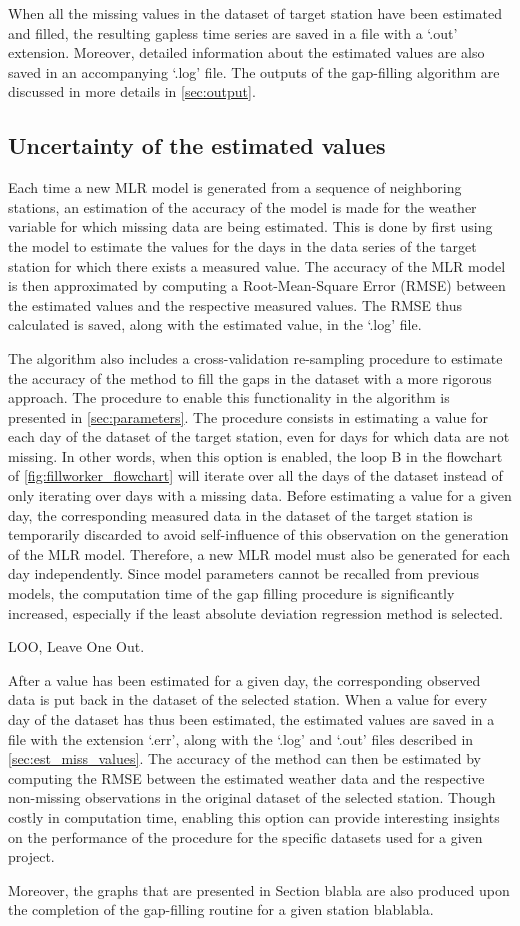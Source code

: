 \documentclass[TechnicalNoteMeteo.tex]{subfiles}
\begin{document}
When all the missing values in the dataset of target station have been estimated and filled, the resulting gapless time series are saved in a file with a `.out' extension. Moreover, detailed information about the estimated values are also saved in an accompanying `.log' file. The outputs of the gap-filling algorithm are discussed in more details in \cref{sec:output}.

\subsection{Uncertainty of the estimated values}

Each time a new MLR model is generated from a sequence of neighboring stations, an estimation of the accuracy of the model is made for the weather variable for which missing data are being estimated. This is done by first using the model to estimate the values for the days in the data series of the target station for which there exists a measured value. The accuracy of the MLR model is then approximated by computing a Root-Mean-Square Error (RMSE) between the estimated values and the respective measured values. The RMSE thus calculated is saved, along with the estimated value, in the `.log' file.

The algorithm also includes a cross-validation re-sampling procedure to estimate the accuracy of the method to fill the gaps in the dataset with a more rigorous approach. The procedure to enable this functionality in the algorithm is presented in \cref{sec:parameters}. The procedure consists in estimating a value for each day of the dataset of the target station, even for days for which data are not missing. In other words, when this option is enabled, the loop B in the flowchart of \cref{fig:fillworker_flowchart} will iterate over all the days of the dataset instead of only iterating over days with a missing data. Before estimating a value for a given day, the corresponding measured data in the dataset of the target station is temporarily discarded to avoid self-influence of this observation on the generation of the MLR model. Therefore, a new MLR model must also be generated for each day independently. Since model parameters cannot be recalled from previous models, the computation time of the gap filling procedure is significantly increased, especially if the least absolute deviation regression method is selected.

LOO, Leave One Out.

After a value has been estimated for a given day, the corresponding observed data is put back in the dataset of the selected station. When a value for every day of the dataset has thus been estimated, the estimated values are saved in a file with the extension `.err', along with the `.log' and `.out' files described in \cref{sec:est_miss_values}. The accuracy of the method can then be estimated by computing the RMSE between the estimated weather data and the respective non-missing observations in the original dataset of the selected station. Though costly in computation time, enabling this option can provide interesting insights on the performance of the procedure for the specific datasets used for a given project.

Moreover, the graphs that are presented in Section blabla are also produced upon the completion of the gap-filling routine for a given station blablabla.
\end{document}
